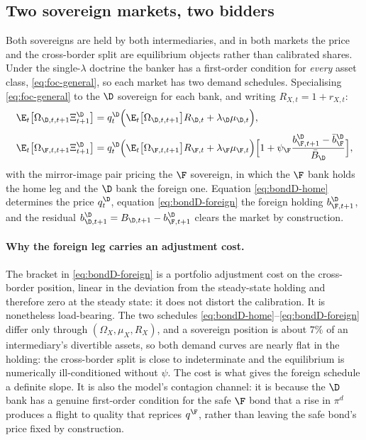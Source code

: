 \subsection{Two sovereign markets, two bidders}
\label{sec:sovereign-markets}

Both sovereigns are held by both intermediaries, and in both markets the price
and the cross-border split are equilibrium objects rather than calibrated shares.
Under the single-$\lambda$ doctrine the banker has a first-order condition for
\emph{every} asset class, \eqref{eq:foc-general}, so each market has two demand
schedules. Specialising \eqref{eq:foc-general} to the $\D$ sovereign for each
bank, and writing $R_{X,t}=1+r_{X,t}$:
\begin{align}
\E_t\bigl[\Omega_{\D,t,t+1}\Xi^{\D}_{t+1}\bigr]
&=q^{\D}_{t}\Bigl(\E_t\bigl[\Omega_{\D,t,t+1}\bigr]R_{\D,t}+\lambda_\D\mu_{\D,t}\Bigr),
\label{eq:bondD-home}\\[3pt]
\E_t\bigl[\Omega_{\F,t,t+1}\Xi^{\D}_{t+1}\bigr]
&=q^{\D}_{t}\Bigl(\E_t\bigl[\Omega_{\F,t,t+1}\bigr]R_{\F,t}+\lambda_\F\mu_{\F,t}\Bigr)
  \Bigl[1+\psi_\F\frac{b^{\D}_{\F,t+1}-\bar b^{\D}_{\F}}{\bar B_\D}\Bigr],
\label{eq:bondD-foreign}
\end{align}
with the mirror-image pair pricing the $\F$ sovereign, in which the $\F$ bank
holds the home leg and the $\D$ bank the foreign one. Equation
\eqref{eq:bondD-home} determines the price $q^{\D}_t$, equation
\eqref{eq:bondD-foreign} the foreign holding $b^{\D}_{\F,t+1}$, and the residual
$b^{\D}_{\D,t+1}=B_{\D,t+1}-b^{\D}_{\F,t+1}$ clears the market by construction.

\paragraph{Why the foreign leg carries an adjustment cost.} The bracket in
\eqref{eq:bondD-foreign} is a portfolio adjustment cost on the cross-border
position, linear in the deviation from the steady-state holding and therefore
zero at the steady state: it does not distort the calibration. It is nonetheless
load-bearing. The two schedules \eqref{eq:bondD-home}--\eqref{eq:bondD-foreign}
differ only through $(\Omega_X,\mu_X,R_X)$, and a sovereign position is about
$7\%$ of an intermediary's divertible assets, so both demand curves are nearly
flat in the holding: the cross-border split is close to indeterminate and the
equilibrium is numerically ill-conditioned without $\psi$. The cost is what gives
the foreign schedule a definite slope. It is also the model's contagion channel:
it is because the $\D$ bank has a genuine first-order condition for the safe
$\F$ bond that a rise in $\pi^{d}$ produces a flight to quality that reprices
$q^{\F}$, rather than leaving the safe bond's price fixed by construction.


